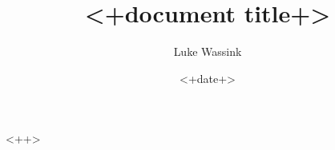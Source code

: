 \documentclass{article}
\title{<+document title+>}
\author{Luke Wassink}
\date{<+date+>}
\begin{document}
\maketitle




<++>





\end{document}
